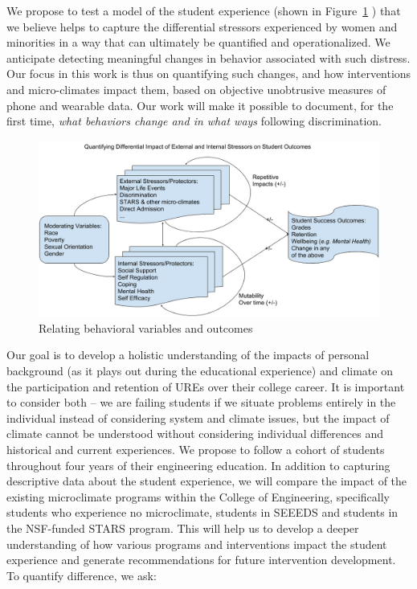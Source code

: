 We  propose to test a model of the student experience (shown in Figure~\ref{fig:model} ) that we believe helps to capture the differential stressors experienced by women and minorities in a way that can ultimately be quantified and operationalized. We anticipate detecting meaningful changes in behavior associated with such distress. Our focus in this work is thus on quantifying such changes, and how interventions and micro-climates impact them, based on objective unobtrusive measures of phone and wearable data. Our work will make it possible to document, for the first time, \textit{what behaviors change and in what ways} following discrimination.  

\begin{figure}
    \centering
    \includegraphics[width=12cm]{img/model2.png}
    \caption{Relating behavioral variables and outcomes}
    \label{fig:model}
\end{figure}

Our goal is to develop a holistic understanding of the impacts of personal background (as it plays out during the educational experience) and climate on the participation and retention of UREs over their college career. It is important to consider both -- we are failing students if we situate problems entirely in the individual instead of considering system and climate issues, but the impact of climate cannot be understood without considering individual differences and historical and current experiences. We propose to follow a cohort of students throughout four years of their engineering education. In addition to capturing descriptive data about the student experience, we will compare the impact of the existing microclimate programs within the College of Engineering, specifically students who experience no microclimate, students in SEEEDS and students in the NSF-funded STARS program.  This will help us to develop a deeper understanding of how various programs and interventions impact the student experience and generate recommendations for future intervention development.
To quantify difference, we ask: %

